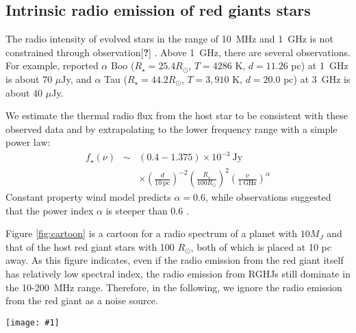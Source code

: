 \documentclass{emulateapj}
\def\memoYF#1{\color{red}$[${\bf #1}$]$ \color{black}}
\def\plotonesc#1{\centering \leavevmode
\texttt{[image: \#1]}}
\begin{document}
\subsection{Intrinsic radio emission of red giants stars}
\label{ss:RGradio}

The radio intensity of evolved stars in the range of 10~MHz and 1~GHz is not constrained through observation\memoYF{?}. 
Above 1~GHz, there are several observations. For example, \citet{gorman2013} reported $\alpha $ Boo ($R_\star = 25.4 R_{\odot }$, $T=4286$ K, $d=11.26$ pc) at 1~GHz is about 70 $\mu$Jy, and $\alpha $ Tau ($R_\star = 44.2  R_{\odot }$, $T=3,910$ K, $d=20.0$ pc) at 3~GHz is about 40 $\mu$Jy. 

We estimate the thermal radio flux from the host star to be consistent with these observed data and by extrapolating to the lower frequency range with a simple power law:
\begin{eqnarray}
f_{\star }(\nu ) &\sim & (0.4-1.375) \times 10^{-3} ~\mbox{Jy} \\
&& \times \left( \frac{d}{10 ~\mbox{pc}} \right)^{-2}  \left( \frac{R_{\star }}{100 R_{\odot }} \right)^2 \left( \frac{\nu}{1~\mbox{GHz}} \right)^{\alpha } 
\end{eqnarray}
Constant property wind model \citep{wright1975,panagia1975,olnon1975} predicts $\alpha = 0.6$, while observations suggested that the power index $\alpha $ is steeper than 0.6 \citep{gorman2013}. 

Figure \ref{fig:cartoon} is a cartoon for a radio spectrum of a planet with $10M_J$ and that of the host red giant stars with 100 $R_{\odot }$, both of which is placed at 10 pc away. 
As this figure indicates, even if the radio emission from the red giant itself has relatively low spectral index, the radio emission from RGHJs still dominate in the 10-200~MHz range. 
Therefore, in the following, we ignore the radio emission from the red giant as a noise source. 

\begin{figure*}[tbp]
   \plotonesc{cartoon2.pdf}
   \caption{A cartoon of radio emission spectra of a RGHJ with 10$M_J$ and the host red giants with 100 $R_{\odot }$. The spectrum of RGHJ is modeled after Jovian radio spectra \citep[e.g.][]{zarka_et_al2004}, while that of the host red giant is obtained simply by extrapolating observed radio spectra above 1~GHz with power law. }
  \label{fig:cartoon}
\end{figure*}
\end{document}
